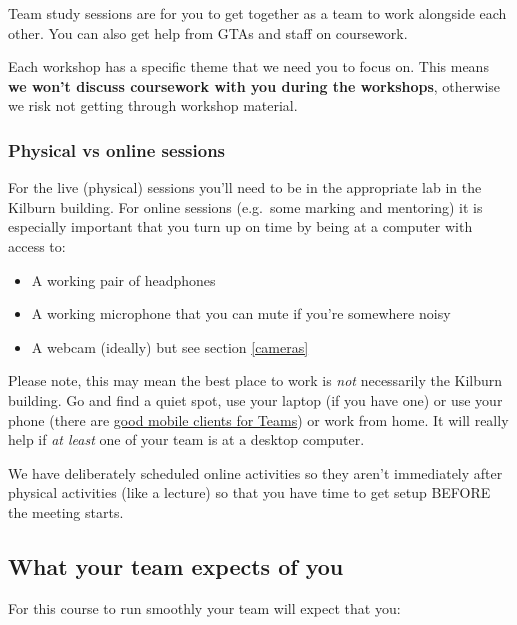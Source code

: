 \documentclass[
]{book}
\providecommand{\tightlist}{%
  \setlength{\itemsep}{0pt}\setlength{\parskip}{0pt}}
\begin{document}
Team study sessions are for you to get together as a team to work alongside each other. You can also get help from GTAs and staff on coursework.

Each workshop has a specific theme that we need you to focus on. This means \textbf{we won't discuss coursework with you during the workshops}, otherwise we risk not getting through workshop material.

\hypertarget{online}{%
\subsubsection{Physical vs online sessions}\label{online}}

For the live (physical) sessions you'll need to be in the appropriate lab in the Kilburn building. For online sessions (e.g.~some marking and mentoring) it is especially important that you turn up on time by being at a computer with access to:

\begin{itemize}
\tightlist
\item
  A working pair of headphones
\item
  A working microphone that you can mute if you're somewhere noisy
\item
  A webcam (ideally) but see section \ref{cameras}
\end{itemize}

Please note, this may mean the best place to work is \emph{not} necessarily the Kilburn building. Go and find a quiet spot, use your laptop (if you have one) or use your phone (there are \href{https://www.microsoft.com/en-gb/microsoft-teams/download-app}{good mobile clients for Teams}) or work from home. It will really help if \emph{at least} one of your team is at a desktop computer.

We have deliberately scheduled online activities so they aren't immediately after physical activities (like a lecture) so that you have time to get setup BEFORE the meeting starts.

\hypertarget{urteam}{%
\subsection{What your team expects of you}\label{urteam}}

For this course to run smoothly your team will expect that you:
\end{document}
